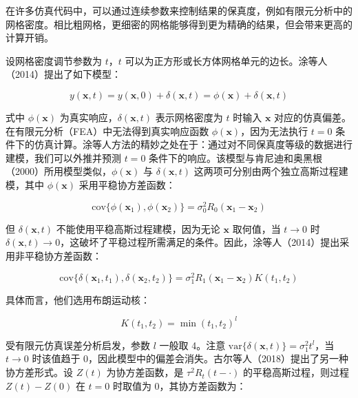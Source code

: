 \documentclass{ctexart}
\begin{document}
在许多仿真代码中，可以通过连续参数来控制结果的保真度，例如有限元分析中的网格密度。相比粗网格，更细密的网格能够得到更为精确的结果，但会带来更高的计算开销。

设网格密度调节参数为 $t$，$t$ 可以为正方形或长方体网格单元的边长。涂等人（2014）提出了如下模型：

\begin{equation*}
y(\boldsymbol{x},t)=y(\boldsymbol{x},0)+\delta(\boldsymbol{x},t)=\phi(\boldsymbol{x})+\delta(\boldsymbol{x},t)
\tag{4.58}
\end{equation*}

式中 $\phi(\boldsymbol{x})$ 为真实响应，$\delta(\boldsymbol{x},t)$ 表示网格密度为 $t$ 时输入 $\boldsymbol{x}$ 对应的仿真偏差。在有限元分析（FEA）中无法得到真实响应函数 $\phi(\boldsymbol{x})$，因为无法执行 $t=0$ 条件下的仿真计算。涂等人方法的精妙之处在于：通过对不同保真度等级的数据进行建模，我们可以外推并预测 $t=0$ 条件下的响应。该模型与肯尼迪和奥黑根（2000）所用模型类似，$\phi(\boldsymbol{x})$ 与 $\delta(\boldsymbol{x},t)$ 这两项可分别由两个独立高斯过程建模，其中 $\phi(\boldsymbol{x})$ 采用平稳协方差函数：

\begin{equation*}
\mathrm{cov}\{\phi(\boldsymbol{x}_1),\phi(\boldsymbol{x}_2)\}=\sigma_0^2R_0(\boldsymbol{x}_1-\boldsymbol{x}_2)
\tag{4.59}
\end{equation*}

但 $\delta(\boldsymbol{x},t)$ 不能使用平稳高斯过程建模，因为无论 $\boldsymbol{x}$ 取何值，当 $t\to0$ 时 $\delta(\boldsymbol{x},t)\to0$，这破坏了平稳过程所需满足的条件。因此，涂等人（2014）提出采用非平稳协方差函数：

\begin{equation*}
\mathrm{cov}\{\delta(\boldsymbol{x}_1,t_1),\delta(\boldsymbol{x}_2,t_2)\}=\sigma_1^2 R_1(\boldsymbol{x}_1-\boldsymbol{x}_2)K(t_1,t_2)
\tag{4.60}
\end{equation*}

具体而言，他们选用布朗运动核：

\begin{equation*}
K(t_1,t_2)=\min(t_1,t_2)^l
\end{equation*}

受有限元仿真误差分析启发，参数 $l$ 一般取 4。注意 $\mathrm{var}\{\delta(\boldsymbol{x},t)\}=\sigma_1^2 t^l$，当 $t\to0$ 时该值趋于 0，因此模型中的偏差会消失。古尔等人（2018）提出了另一种协方差形式。设 $Z(t)$ 为协方差函数，是 $\tau^2R_t(t-\cdot)$ 的平稳高斯过程，则过程 $Z(t)-Z(0)$ 在 $t=0$ 时取值为 0，其协方差函数为：
\end{document}
